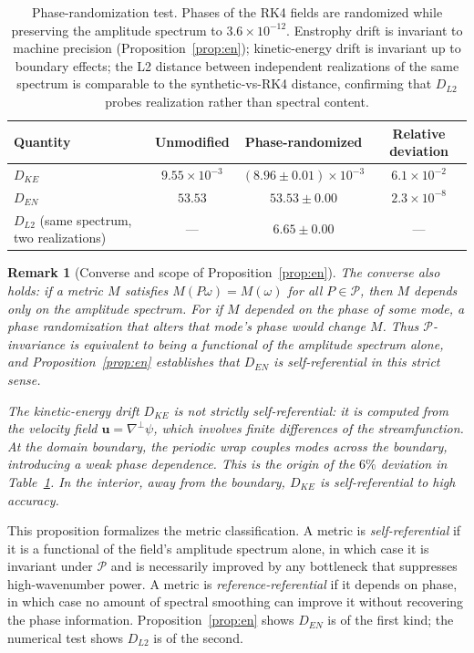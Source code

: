 \documentclass[reprint,aps,pre]{revtex4-2}
\newtheorem{remark}{Remark}
\begin{document}
\begin{table}[t]
\caption{Phase-randomization test. Phases of the RK4 fields are randomized while preserving the amplitude spectrum to $3.6\times10^{-12}$. Enstrophy drift is invariant to machine precision (Proposition~\ref{prop:en}); kinetic-energy drift is invariant up to boundary effects; the L2 distance between independent realizations of the same spectrum is comparable to the synthetic-vs-RK4 distance, confirming that $D_{L2}$ probes realization rather than spectral content.}
\label{tab:phase}
\begin{ruledtabular}
\begin{tabular}{lccc}
Quantity & Unmodified & Phase-randomized & Relative deviation \\
\hline
$D_{KE}$ & $9.55\times10^{-3}$ & $(8.96\pm0.01)\times10^{-3}$ & $6.1\times10^{-2}$ \\
$D_{EN}$ & $53.53$ & $53.53 \pm 0.00$ & $2.3\times10^{-8}$ \\
$D_{L2}$ (same spectrum, two realizations) & --- & $6.65 \pm 0.00$ & --- \\
\end{tabular}
\end{ruledtabular}
\end{table}

\begin{remark}[Converse and scope of Proposition~\ref{prop:en}]
The converse also holds: if a metric $M$ satisfies $M(P\omega)=M(\omega)$ for all $P\in\mathcal{P}$, then $M$ depends only on the amplitude spectrum. For if $M$ depended on the phase of some mode, a phase randomization that alters that mode's phase would change $M$. Thus $\mathcal{P}$-invariance is \textit{equivalent} to being a functional of the amplitude spectrum alone, and Proposition~\ref{prop:en} establishes that $D_{EN}$ is self-referential in this strict sense.

The kinetic-energy drift $D_{KE}$ is \textit{not} strictly self-referential: it is computed from the velocity field $\mathbf{u}=\nabla^\perp\psi$, which involves finite differences of the streamfunction. At the domain boundary, the periodic wrap couples modes across the boundary, introducing a weak phase dependence. This is the origin of the $6\%$ deviation in Table~\ref{tab:phase}. In the interior, away from the boundary, $D_{KE}$ is self-referential to high accuracy.
\end{remark}

This proposition formalizes the metric classification. A metric is \textit{self-referential} if it is a functional of the field's amplitude spectrum alone, in which case it is invariant under $\mathcal{P}$ and is necessarily improved by any bottleneck that suppresses high-wavenumber power. A metric is \textit{reference-referential} if it depends on phase, in which case no amount of spectral smoothing can improve it without recovering the phase information. Proposition~\ref{prop:en} shows $D_{EN}$ is of the first kind; the numerical test shows $D_{L2}$ is of the second.
\end{document}
